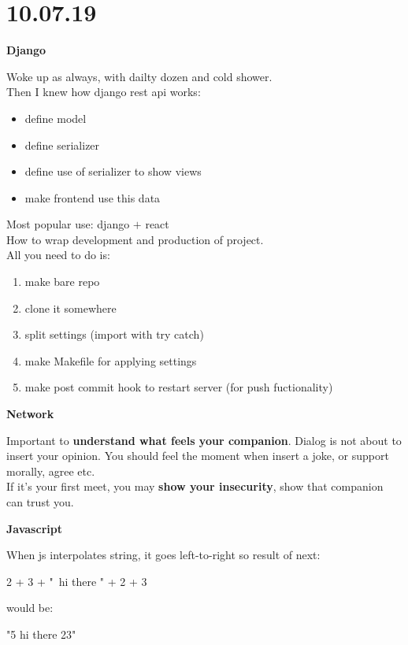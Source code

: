 \documentclass[12pt,a4paper,titlepage]{article}
\begin{document}
\section{10.07.19}
\begin{center}
    \large \textbf{Django}
\end{center}
Woke up as always, with dailty dozen and cold shower.\\
Then I knew how django rest api works:
\begin{itemize}
    \item{define model}
    \item{define serializer}
    \item{define use of serializer to show views}
    \item{make frontend use this data}
\end{itemize}
Most popular use: django $+$ react\\
How to wrap development and production of project.\\
All you need to do is: 
\begin{enumerate}
    \item{make bare repo}
    \item{clone it somewhere}
    \item{split settings (import with try catch)}
    \item{make Makefile for applying settings}
    \item{make post commit hook to restart server (for push fuctionality)}
\end{enumerate}

\begin{center}
    \large \textbf{Network}
\end{center}
Important to \textbf{understand what feels your companion}. Dialog is not about to insert your opinion.
You should feel the moment when insert a joke, or support morally, agree etc.\\
If it's your first meet, you may \textbf{show your insecurity}, show that companion can trust you.

\begin{center}
    \large \textbf{Javascript}
\end{center}
When js interpolates string, it goes left-to-right so result of next:
\begin{center}
    2 + 3 + "\ hi there " + 2 + 3
\end{center}
would be:
\begin{center}
    "5 hi there 23"
\end{center}
\end{document}
